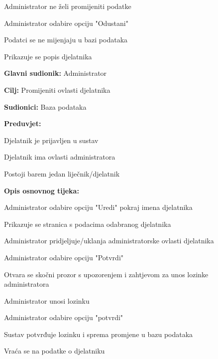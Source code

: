 \begin{packed_item}
\begin{packed_item}
						\item[4.a] Administrator ne želi promijeniti podatke 
						\item[] \begin{packed_enum}
							\item Administrator odabire opciju "Odustani"
							\item Podatci se ne mijenjaju u bazi podataka
							\item Prikazuje se popis djelatnika							
						\end{packed_enum}
					\end{packed_item}
				\end{packed_item}
				
				
				\noindent {}
				\begin{packed_item}
					
					\item \textbf{Glavni sudionik: }Administrator
					\item  \textbf{Cilj: }Promijeniti ovlasti djelatnika
					\item  \textbf{Sudionici: }Baza podataka
					\item  \textbf{Preduvjet: }
					\item[] \begin{packed_enum}
						
						\item[-] Djelatnik je prijavljen u sustav
						\item[-] Djelatnik ima ovlasti administratora
						\item[-] Postoji barem jedan liječnik/djelatnik
					\end{packed_enum}
					\item  \textbf{Opis osnovnog tijeka: }
					
					\item[] \begin{packed_enum}
						\item Administrator odabire opciju "Uredi" pokraj imena djelatnika
						\item Prikazuje se stranica s podacima odabranog djelatnika
						\item Administrator pridjeljuje/uklanja administratorske ovlasti djelatnika
						\item Administrator odabire opciju "Potvrdi"
						\item Otvara se skočni prozor s upozorenjem i zahtjevom za unos lozinke administratora
						\item Administrator unosi lozinku
						\item Administrator odabire opciju "potvrdi"
						\item Sustav potvrđuje lozinku i sprema promjene u bazu podataka
						\item Vraća se na podatke o djelatniku
					\end{packed_enum}
					

\end{packed_item}

